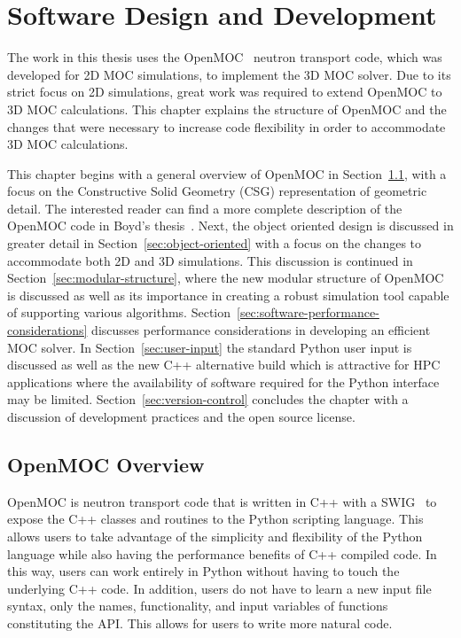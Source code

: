 \chapter{Software Design and Development}
\label{chap:software-design}

The work in this thesis uses the OpenMOC~\cite{openmoc} neutron transport code, which was developed for 2D \ac{MOC} simulations, to implement the 3D \ac{MOC} solver. Due to its strict focus on 2D simulations, great work was required to extend OpenMOC to 3D \ac{MOC} calculations. This chapter explains the structure of OpenMOC and the changes that were necessary to increase code flexibility in order to accommodate 3D \ac{MOC} calculations. 

This chapter begins with a general overview of OpenMOC in Section~\ref{sec:openmoc-overview}, with a focus on the Constructive Solid Geometry (CSG) representation of geometric detail. The interested reader can find a more complete description of the OpenMOC code in Boyd's thesis~\cite{boyd2014openmoc}. Next, the object oriented design is discussed in greater detail in Section~\ref{sec:object-oriented} with a focus on the changes to accommodate both 2D and 3D simulations. This discussion is continued in Section~\ref{sec:modular-structure}, where the new modular structure of OpenMOC is discussed as well as its importance in creating a robust simulation tool capable of supporting various algorithms. Section~\ref{sec:software-performance-considerations} discusses performance considerations in developing an efficient \ac{MOC} solver. In Section~\ref{sec:user-input} the standard Python user input is discussed as well as the new C++ alternative build which is attractive for \ac{HPC} applications where the availability of software required for the Python interface may be limited. Section~\ref{sec:version-control} concludes the chapter with a discussion of development practices and the open source license.

\section{OpenMOC Overview}
\label{sec:openmoc-overview}

OpenMOC is neutron transport code that is written in C++ with a \ac{SWIG}~\cite{swig} to expose the C++ classes and routines to the Python scripting language. This allows users to take advantage of the simplicity and flexibility of the Python language while also having the performance benefits of C++ compiled code. In this way, users can work entirely in Python without having to touch the underlying C++ code. In addition, users do not have to learn a new input file syntax, only the names, functionality, and input variables of functions constituting the \ac{API}. This allows for users to write more natural code.

